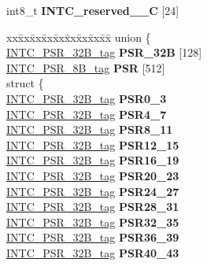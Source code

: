 \begin{DoxyCompactItemize}
\begin{tabbing}
\end{tabbing}\item 
\mbox{\label{structINTC__struct__tag_ac27df5830f0d2998e86e601cfba3252a}} 
int8\+\_\+t {\bfseries I\+N\+T\+C\+\_\+reserved\+\_\+\_\+C} \mbox{[}24\mbox{]}
\item 
\mbox{\label{structINTC__struct__tag_a755447fd48c12ae19c72965c99aaa9e4}} 
\begin{tabbing}
xx\=xx\=xx\=xx\=xx\=xx\=xx\=xx\=xx\=\kill
union \{\\
\>\mbox{\hyperlink{unionINTC__PSR__32B__tag}{INTC\_PSR\_32B\_tag}} {\bfseries PSR\_32B} \mbox{[}128\mbox{]}\\
\>\mbox{\hyperlink{unionINTC__PSR__8B__tag}{INTC\_PSR\_8B\_tag}} {\bfseries PSR} \mbox{[}512\mbox{]}\\
\mbox{\label{unionINTC__struct__tag_1_1_0D2291_ac4356d3832e051c4bfe869ba910dd176}} 
\>struct \{\\
\>\>\mbox{\hyperlink{unionINTC__PSR__32B__tag}{INTC\_PSR\_32B\_tag}} {\bfseries PSR0\_3}\\
\>\>\mbox{\hyperlink{unionINTC__PSR__32B__tag}{INTC\_PSR\_32B\_tag}} {\bfseries PSR4\_7}\\
\>\>\mbox{\hyperlink{unionINTC__PSR__32B__tag}{INTC\_PSR\_32B\_tag}} {\bfseries PSR8\_11}\\
\>\>\mbox{\hyperlink{unionINTC__PSR__32B__tag}{INTC\_PSR\_32B\_tag}} {\bfseries PSR12\_15}\\
\>\>\mbox{\hyperlink{unionINTC__PSR__32B__tag}{INTC\_PSR\_32B\_tag}} {\bfseries PSR16\_19}\\
\>\>\mbox{\hyperlink{unionINTC__PSR__32B__tag}{INTC\_PSR\_32B\_tag}} {\bfseries PSR20\_23}\\
\>\>\mbox{\hyperlink{unionINTC__PSR__32B__tag}{INTC\_PSR\_32B\_tag}} {\bfseries PSR24\_27}\\
\>\>\mbox{\hyperlink{unionINTC__PSR__32B__tag}{INTC\_PSR\_32B\_tag}} {\bfseries PSR28\_31}\\
\>\>\mbox{\hyperlink{unionINTC__PSR__32B__tag}{INTC\_PSR\_32B\_tag}} {\bfseries PSR32\_35}\\
\>\>\mbox{\hyperlink{unionINTC__PSR__32B__tag}{INTC\_PSR\_32B\_tag}} {\bfseries PSR36\_39}\\
\>\>\mbox{\hyperlink{unionINTC__PSR__32B__tag}{INTC\_PSR\_32B\_tag}} {\bfseries PSR40\_43}\\

\end{tabbing}
\end{DoxyCompactItemize}
